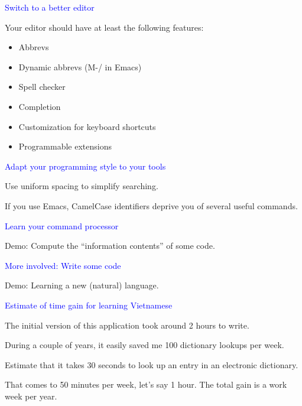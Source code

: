 \documentclass{slides}
\newcommand{\ti}[1]{\begin{center}\Large{\textcolor{blue}{#1}}\end{center}}
\begin{document}
\begin{slide}\ti{Switch to a better editor}

Your editor should have at least the following features:

\begin{itemize}
\item Abbrevs
\item Dynamic abbrevs (M-/ in Emacs)
\item Spell checker
\item Completion
\item Customization for keyboard shortcuts
\item Programmable extensions
\end{itemize}

\vfill\end{slide}
\begin{slide}\ti{Adapt your programming style to your tools}

Use uniform spacing to simplify searching.

If you use Emacs, CamelCase identifiers deprive you of several useful
commands.

\vfill\end{slide}
\begin{slide}\ti{Learn your command processor}

Demo: Compute the ``information contents'' of some code.

\vfill\end{slide}
\begin{slide}\ti{More involved: Write some code}

Demo: Learning a new (natural) language.

\vfill\end{slide}
\begin{slide}\ti{Estimate of time gain for learning Vietnamese}

The initial version of this application took around 2 hours to write.

During a couple of years, it easily saved me 100 dictionary lookups
per week.  

Estimate that it takes 30 seconds to look up an entry in an electronic
dictionary.

That comes to 50 minutes per week, let's say 1 hour.  The total gain
is a work week per year.

\vfill\end{slide}
\end{document}
